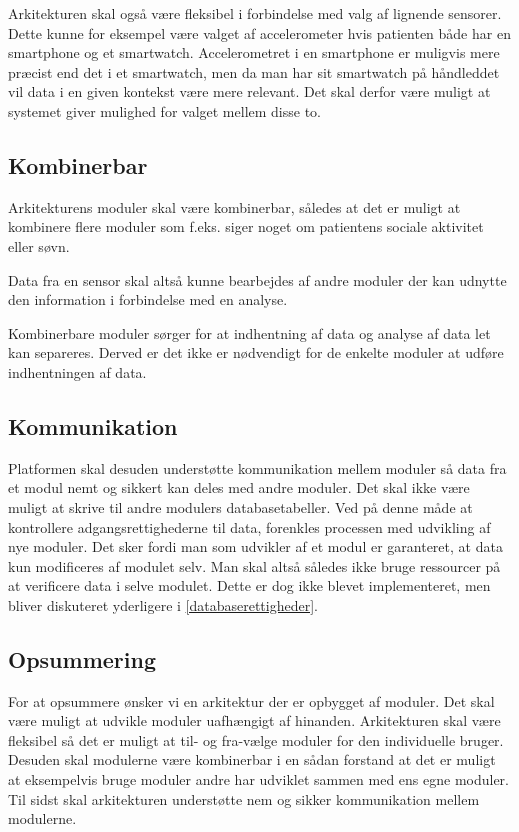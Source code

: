 Arkitekturen skal også være fleksibel i forbindelse med valg af lignende sensorer.
Dette kunne for eksempel være valget af accelerometer hvis patienten både har en smartphone og et smartwatch.
Accelerometret i en smartphone er muligvis mere præcist end det i et smartwatch, men da man har sit smartwatch på håndleddet vil data i en given kontekst være mere relevant.
Det skal derfor være muligt at systemet giver mulighed for valget mellem disse to.

\subsection{Kombinerbar}\label{arkitekturkrav::kombinerbar}
Arkitekturens moduler skal være kombinerbar, således at det er muligt at kombinere flere moduler som f.eks. siger noget om patientens sociale aktivitet eller søvn.

Data fra en sensor skal altså kunne bearbejdes af andre moduler der kan udnytte den information i forbindelse med en analyse.

Kombinerbare moduler sørger for at indhentning af data og analyse af data let kan separeres.
Derved er det ikke er nødvendigt for de enkelte moduler at udføre indhentningen af data.

\subsection{Kommunikation}\label{arkitekturkrav::kommunikation}
Platformen skal desuden understøtte kommunikation mellem moduler så data fra et modul nemt og sikkert kan deles med andre moduler.
Det skal ikke være muligt at skrive til andre modulers databasetabeller.
Ved på denne måde at kontrollere adgangsrettighederne til data, forenkles processen med udvikling af nye moduler.
Det sker fordi man som udvikler af et modul er garanteret, at data kun modificeres af modulet selv.
Man skal altså således ikke bruge ressourcer på at verificere data i selve modulet.
Dette er dog ikke blevet implementeret, men bliver diskuteret yderligere i \cref{databaserettigheder}.

\subsection{Opsummering}
For at opsummere ønsker vi en arkitektur der er opbygget af moduler.
Det skal være muligt at udvikle moduler uafhængigt af hinanden.
Arkitekturen skal være fleksibel så det er muligt at til- og fra-vælge moduler for den individuelle bruger.
Desuden skal modulerne være kombinerbar i en sådan forstand at det er muligt at eksempelvis bruge moduler andre har udviklet sammen med ens egne moduler.
Til sidst skal arkitekturen understøtte nem og sikker kommunikation mellem modulerne.

